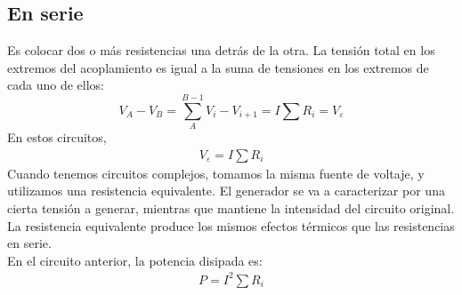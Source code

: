 \documentclass{./FisicaII.tex}
\begin{document}
\subsection{En serie}
Es colocar dos o más resistencias una detrás de la otra. La tensión total en los extremos del acoplamiento es igual a la suma de tensiones en los extremos de cada uno de ellos:
\[
	V_{A} - V_{B} = \sum_{A}^{B-1} V_{i} - V_{i+1} = I \sum R_{i} = V_{\varepsilon}
\]
En estos circuitos,
\begin{equation}
	\begin{split}
		V_{\varepsilon} = I \sum R_{i}
	\end{split}
\end{equation}
Cuando tenemos circuitos complejos, tomamos la misma fuente de voltaje, y utilizamos una resistencia equivalente. El generador se va a caracterizar por una cierta tensión a generar, mientras que mantiene la intensidad del circuito original. La resistencia equivalente produce los mismos efectos térmicos que las resistencias en serie.\\
En el circuito anterior, la potencia disipada es:
\begin{equation}
	\begin{split}
		P = I ^{2} \sum R_{i}
	\end{split}
\end{equation}
\end{document}
